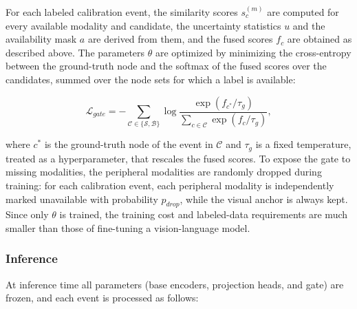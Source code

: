 For each labeled calibration event, the similarity scores $s_c^{(m)}$ are computed for every available modality and candidate, the uncertainty statistics $u$ and the availability mask $a$ are derived from them, and the fused scores $f_c$ are obtained as described above. The parameters $\theta$ are optimized by minimizing the cross-entropy between the ground-truth node and the softmax of the fused scores over the candidates, summed over the node sets for which a label is available:

$$\mathcal{L}_{gate} = -\sum_{\mathcal{C}\in\{\mathcal{S},\mathcal{B}\}} \log \frac{\exp\left(f_{c^{*}}/\tau_g\right)}{\sum_{c\in\mathcal{C}} \exp\left(f_{c}/\tau_g\right)},$$

where $c^{*}$ is the ground-truth node of the event in $\mathcal{C}$ and $\tau_g$ is a fixed temperature, treated as a hyperparameter, that rescales the fused scores. To expose the gate to missing modalities, the peripheral modalities are randomly dropped during training: for each calibration event, each peripheral modality is independently marked unavailable with probability $p_{drop}$, while the visual anchor is always kept. Since only $\theta$ is trained, the training cost and labeled-data requirements are much smaller than those of fine-tuning a vision-language model.

\subsubsection{Inference}\label{sec:inference}

At inference time all parameters (base encoders, projection heads, and gate) are frozen, and each event is processed as follows:

